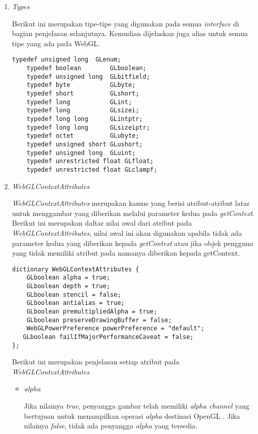 \begin{enumerate}
\item {\it Types}

	Berikut ini merupakan tipe-tipe yang digunakan pada semua {\it interface} di bagian penjelasan selanjutnya. Kemudian dijelaskan juga alias untuk semua tipe yang ada pada WebGL.
	\begin{lstlisting}[caption={Alias untuk tipe pada WebGL.}, captionpos=b]
	typedef unsigned long  GLenum;
	typedef boolean        GLboolean;
	typedef unsigned long  GLbitfield;
	typedef byte           GLbyte;
	typedef short          GLshort;
	typedef long           GLint;
	typedef long           GLsizei;
	typedef long long      GLintptr;
	typedef long long      GLsizeiptr;
	typedef octet          GLubyte;
	typedef unsigned short GLushort;
	typedef unsigned long  GLuint;
	typedef unrestricted float GLfloat;
	typedef unrestricted float GLclampf;
	\end{lstlisting}
	
\item {\it WebGLContextAttributes}

	{\it WebGLContextAttributes} merupakan kamus yang berisi atribut-atribut latar untuk menggambar yang diberikan melalui parameter kedua pada {\it getContext}. Berikut ini merupakan daftar nilai awal dari atribut pada {\it WebGLContextAttributes}, nilai awal ini akan digunakan apabila tidak ada parameter kedua yang diberikan kepada {\it getContext} atau jika objek pengguna yang tidak memiliki atribut pada namanya diberikan kepada getContext. 
	\begin{lstlisting}[caption={Nilai awal pada {\it WebGLContextAttributes} saat tidak ada parameter kedua yang diberikan.}, captionpos=b]
dictionary WebGLContextAttributes {
    GLboolean alpha = true;
    GLboolean depth = true;
    GLboolean stencil = false;
    GLboolean antialias = true;
    GLboolean premultipliedAlpha = true;
    GLboolean preserveDrawingBuffer = false;
    WebGLPowerPreference powerPreference = "default";
   GLboolean failIfMajorPerformanceCaveat = false;
};
	\end{lstlisting}
	Berikut ini merupakan penjelasan setiap atribut pada {\it WebGLContextAttributes} 
	\begin{itemize}
	\item {\it alpha}
	
	Jika nilainya {\it true}, penyangga gambar telah memiliki {\it alpha channel} yang bertujuan untuk menampilkan operasi {\it alpha} destinasi OpenGL . Jika nilainya {\it false}, tidak ada penyangga {\it alpha} yang tersedia.
	

\end{itemize}
\end{enumerate}
